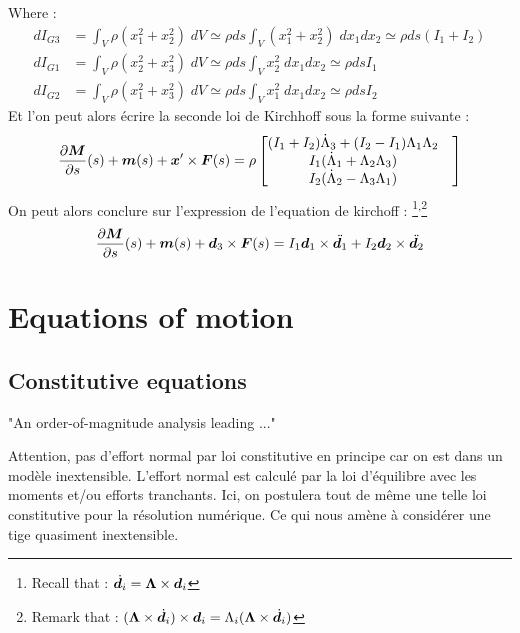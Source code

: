 Where :
\begin{subequations}
	\begin{align}
		dI_{G3} &= \int_V \rho (x_1^2+ x_2^2)\;dV
		\simeq \rho ds \int_V (x_1^2+x_2^2)\;dx_1dx_2
		\simeq \rho ds (I_1 + I_2)
		\\
		dI_{G1} &= \int_V \rho (x_2^2+ x_3^2)\;dV
		\simeq \rho ds \int_V x_2^2\;dx_1dx_2
		\simeq \rho ds I_1
		\\
		dI_{G2} &= \int_V \rho (x_1^2+ x_3^2)\;dV
		\simeq \rho ds \int_V x_1^2\;dx_1dx_2
		\simeq \rho ds I_2
	\end{align}
\end{subequations}
Et l'on peut alors écrire la seconde loi de Kirchhoff sous la forme suivante :
\begin{equation}
	\begin{aligned}
		\frac{\partial \boldsymbol{M}}{\partial s}(s)+\boldsymbol{m}(s) + \boldsymbol{x}'\times \boldsymbol{F}(s)
		= \rho
			\begin{bmatrix}
				(I_1 + I_2)\dot{\Lambda}_3 + (I_2 - I_1)\Lambda_1\Lambda_2&\\
				I_1 (\dot{\Lambda}_1 + \Lambda_2 \Lambda_3) &\\
				I_2 (\dot{\Lambda}_2 - \Lambda_3 \Lambda_1) &
			\end{bmatrix}
	\end{aligned}
\end{equation}
On peut alors conclure sur l'expression de l'equation de kirchoff : \footnote{Recall that : $\dot{\boldsymbol{d}_i} = \boldsymbol{\Lambda} \times \boldsymbol{d}_i$}\textsuperscript{,}\footnote{Remark that : $(\boldsymbol{\Lambda}\times\dot{\boldsymbol{d}_i})\times\boldsymbol{d}_i = \Lambda_i(\boldsymbol{\Lambda}\times\dot{\boldsymbol{d}_i})$}
\begin{equation}
	\frac{\partial \boldsymbol{M}}{\partial s}(s)+\boldsymbol{m}(s) + \boldsymbol{d}_3 \times \boldsymbol{F}(s) = I_1 \boldsymbol{d}_1 \times \ddot{\boldsymbol{d}_1} + I_2 \boldsymbol{d}_2 \times \ddot{\boldsymbol{d}_2}
\end{equation}

\section{Equations of motion}
\subsection{Constitutive equations}

"An order-of-magnitude analysis leading ..."

Attention, pas d'effort normal par loi constitutive en principe car on est dans un modèle inextensible.
L'effort normal est calculé par la loi d'équilibre avec les moments et/ou efforts tranchants.
Ici, on postulera tout de même une telle loi constitutive pour la résolution numérique. Ce qui nous amène à considérer une tige quasiment inextensible.


